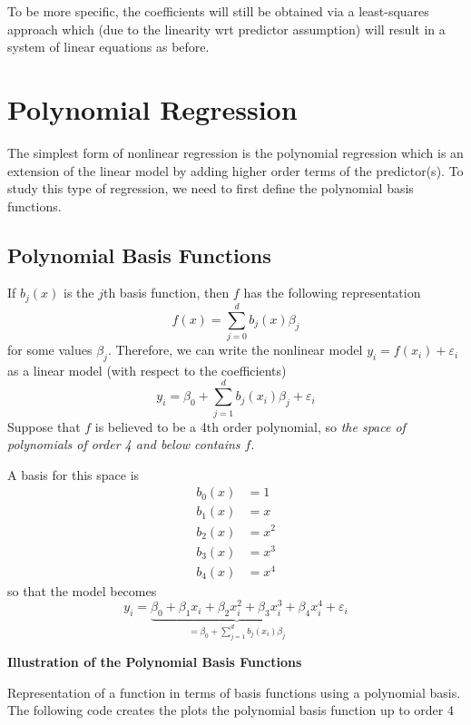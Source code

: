 \documentclass[
]{book}
\begin{document}
To be more specific, the coefficients will still be obtained via a least-squares approach which (due to the linearity wrt predictor assumption) will result in a system of linear equations as before.

\section{Polynomial Regression}\label{polynomial-regression}

The simplest form of nonlinear regression is the polynomial regression which is an extension of the linear model by adding higher order terms of the predictor(s). To study this type of regression, we need to first define the polynomial basis functions.

\subsection{Polynomial Basis Functions}\label{polynomial-basis-functions}

If \(b_j(x)\) is the \(j\)th basis function, then \(f\) has the following representation
\[f(x) = \sum_{j=0}^{d} b_j(x) \beta_j\]
for some values \(\beta_j\). Therefore, we can write the nonlinear model \(y_i = f(x_i) + \varepsilon_i\) as a linear model (with respect to the coefficients)
\[y_i = \beta_0 + \sum_{j=1}^{d} b_j(x_i) \beta_j + \varepsilon_i\]
Suppose that \(f\) is believed to be a 4th order polynomial, so \emph{the space of polynomials of order 4 and below contains \(f\)}.

A basis for this space is
\begin{align*}
b_0(x) &= 1\\
b_1(x) &= x\\
b_2(x) &= x^2\\
b_3(x) &= x^3\\
b_4(x) &= x^4
\end{align*}
so that the model becomes
\[y_i = \underbrace{\beta_0 + \beta_1 x_i+\beta_2 x^2_i+ \beta_3 x^3_i + \beta_4 x^4_i}_{= \beta_0 + \sum_{j=1}^{d} b_j(x_i) \beta_j} +\varepsilon_i\]

\textbf{Illustration of the Polynomial Basis Functions}

Representation of a function in terms of basis functions using a polynomial basis. The following code creates the plots the polynomial basis function up to order 4
\end{document}
